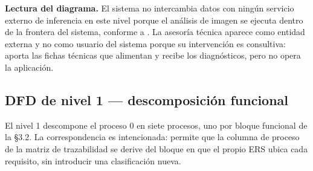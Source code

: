 \noindent
\textbf{Lectura del diagrama.} El sistema no intercambia datos con ningún servicio externo de
inferencia en este nivel porque el análisis de imagen se ejecuta dentro de la frontera del sistema,
conforme a . La asesoría técnica aparece como entidad externa y no como usuario del
sistema porque su intervención es consultiva: aporta las fichas técnicas que alimentan  y
recibe los diagnósticos, pero no opera la aplicación.

\subsection{DFD de nivel 1 --- descomposición funcional}

El nivel 1 descompone el proceso 0 en siete procesos, uno por bloque funcional de la §3.2. La
correspondencia es intencionada: permite que la columna de proceso de la matriz de trazabilidad se
derive del bloque en que el propio ERS ubica cada requisito, sin introducir una clasificación nueva.

